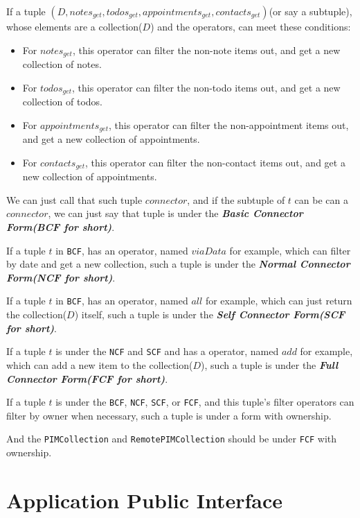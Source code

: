 \documentclass{article}
\begin{document}
   If a tuple $(D,notes_{get},todos_{get},appointments_{get},contacts_{get})$(or say a subtuple), whose elements are a collection($D$) and the operators,
   can meet these conditions:
   \begin{itemize}
       \item For $notes_{get}$, this operator can filter the non-note items out, and get a new collection of notes.
       \item For $todos_{get}$, this operator can filter the non-todo items out, and get a new collection of todos.
       \item For $appointments_{get}$, this operator can filter the non-appointment items out, and get a new collection of appointments.
       \item For $contacts_{get}$, this operator can filter the non-contact items out, and get a new collection of appointments.
   \end{itemize}
   We can just call that such tuple $connector$, and if the subtuple of $t$ can be can a $connector$, we can just say that tuple
   is under the \textbf{\textit{Basic Connector Form(BCF for short)}}.

  If a tuple $t$ in \verb|BCF|, has an operator, named $viaData$ for example, which can filter by date and get a new collection,
  such a tuple is under the \textbf{\textit{Normal Connector Form(NCF for short)}}.

  If a tuple $t$ in \verb|BCF|, has an operator, named $all$ for example, which can just return the collection($D$) itself,
  such a tuple is under the \textbf{\textit{Self Connector Form(SCF for short)}}.

  If a tuple $t$ is under the \verb|NCF| and \verb|SCF| and has a operator, named $add$ for example, which can add a new item to the collection($D$),
  such a tuple is under the \textbf{\textit{Full Connector Form(FCF for short)}}.

  If a tuple $t$ is under the \verb|BCF|, \verb|NCF|, \verb|SCF|, or \verb|FCF|, and this tuple's filter operators can filter by owner when necessary,
  such a tuple is under a form with ownership.

  And the \lstinline|PIMCollection| and \lstinline|RemotePIMCollection| should be under \verb|FCF| with ownership.


  \section{Application Public Interface}
\end{document}
